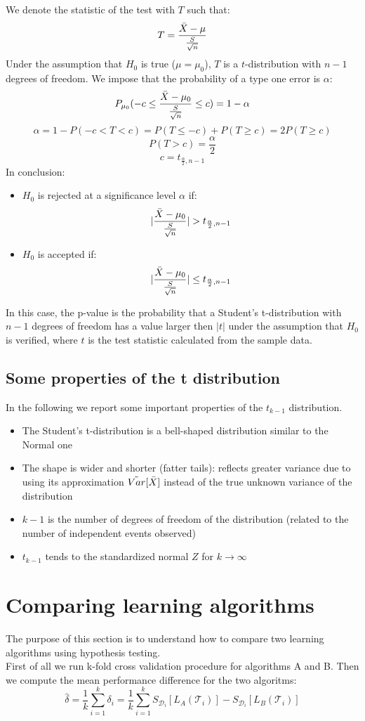 We denote the statistic of the test with $T$ such that:
$$T = \frac{\Bar{X}-\mu}{\frac{S}{\sqrt{n}}}$$
Under the assumption that $H_0$ is true ($\mu = \mu_0$), $T$ is a $t$-distribution with $n-1$ degrees of freedom. We impose that the probability of a type one error is $\alpha$:
$$P_{\mu_0}(-c \leq \frac{\Bar{X}-\mu_0}{\frac{S}{\sqrt{n}}} \leq c) = 1 - \alpha$$
$$\alpha = 1 - P(-c < T < c) = P(T \leq -c) + P(T \geq c) = 2P(T \geq c)$$
$$P(T>c) = \frac{\alpha}{2}$$
$$c = t_{\frac{\alpha}{2},n-1}$$
In conclusion:
\begin{itemize}
    \item $H_0$ is rejected at a significance level $\alpha$ if:
    $$|\frac{\Bar{X}-\mu_0}{\frac{S}{\sqrt{n}}}|>t_{\frac{\alpha}{2},n-1}$$
    
    \item $H_0$ is accepted if:
    $$|\frac{\Bar{X}-\mu_0}{\frac{S}{\sqrt{n}}}|\leq t_{\frac{\alpha}{2},n-1}$$
\end{itemize}

In this case, the p-value is the probability that a Student's t-distribution with $n-1$ degrees of freedom has a value larger then $|t|$ under the assumption that $H_0$ is verified, where $t$ is the test statistic calculated from the sample data.

\subsection{Some properties of the t distribution}
In the following we report some important properties of the $t_{k-1}$ distribution.
\begin{itemize}
    \item The Student's t-distribution is a bell-shaped distribution similar to the Normal one
    \item The shape is wider and shorter (fatter tails): reflects greater variance due to using its approximation $\tilde{Var}[\Bar{X}]$ instead of the true unknown variance of the distribution
    \item $k-1$ is the number of degrees of freedom of the distribution (related to the number of independent events observed)
    \item $t_{k-1}$ tends to the standardized normal $Z$ for $k \rightarrow \infty$
\end{itemize}

\section{Comparing learning algorithms}
The purpose of this section is to understand how to compare two learning algorithms using hypothesis testing.\\
First of all we run k-fold cross validation procedure for algorithms A and B. Then we compute the mean performance difference for the two algoritms:
\begin{equation}
    \hat{\delta} = \frac{1}{k} \sum_{i=1}^k \delta_i = \frac{1}{k} \sum_{i=1}^k S_{\mathcal{D}_i}[L_A(\mathcal{T}_i)] - S_{\mathcal{D}_i}[L_B(\mathcal{T}_i)]
\end{equation}

